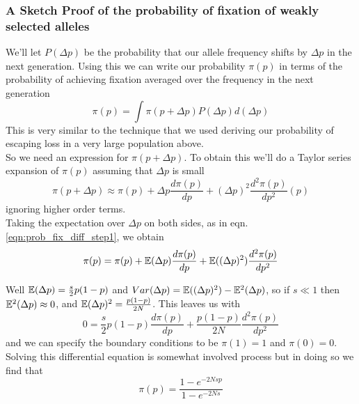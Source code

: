 \subsubsection{A Sketch Proof of the probability of fixation of
weakly selected alleles} \label{Section:fixation_weakly_sel}

We'll let $P(\Delta p)$ be the probability that our allele frequency
shifts by $\Delta p$ in the next generation. Using this we can write our probability $\pi(p)$ in terms of the probability of
achieving fixation averaged over the frequency in the next generation
\begin{equation}
\pi(p)  = \int \pi(p+\Delta p) P(\Delta p) d(\Delta p) \label{eqn:prob_fix_diff_step1}
\end{equation}
This is very similar to the technique that we used deriving our
probability of escaping loss in a very large population above. \\

So we need an expression for $\pi(p+\Delta p)$. To obtain this we'll
do a Taylor series expansion of $\pi(p)$ assuming that $\Delta p $ is small
\begin{equation}
\pi(p+\Delta p) \approx \pi(p) + \Delta p \frac{d\pi(p)}{dp} + (\Delta p)^2
\frac{d^2\pi(p)}{dp^2} (p)
\end{equation}
ignoring higher order terms.\\

Taking the expectation over $\Delta p $ on both sides, as in
eqn. \ref{eqn:prob_fix_diff_step1}, we obtain
\begin{equation}
\pi(p) = \pi(p) + \mathbb{E}(\Delta p) \frac{d\pi (p)}{dp} + \mathbb{E}((\Delta p)^2)
\frac{d^2\pi(p)}{dp^2}
\end{equation}

Well $\mathbb{E}(\Delta p) = \frac{s}{2}p(1-p)$ and $Var(\Delta p)= \mathbb{E}((\Delta
p)^2)-\mathbb{E}^2(\Delta p)$, so if $s \ll 1$ then $\mathbb{E}^2(\Delta p) \approx
0$, and $\mathbb{E}(\Delta p)^2 = \frac{p(1-p)}{2N}$. This leaves us with
\begin{equation}
0= \frac{s}{2}p(1-p)\frac{d\pi (p) }{dp} + \frac{p(1-p)}{2N}
\frac{d^2\pi (p) }{dp^2}
\end{equation}
and we can specify the boundary conditions to be $\pi(1)=1$ and $\pi(0)=0$. 
Solving this differential equation is somewhat involved process but in
doing so we find that
\begin{equation}
\pi(p) = \frac{1-e^{-2Ns p }}{1-e^{-2Ns}}
\end{equation}


